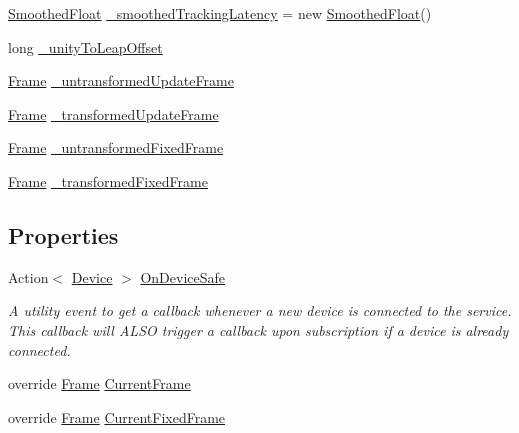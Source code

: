 \begin{DoxyCompactItemize}
\mbox{\hyperlink{class_leap_1_1_unity_1_1_smoothed_float}{Smoothed\+Float}} \mbox{\hyperlink{class_leap_1_1_unity_1_1_leap_service_provider_a03a08f2d279d9884cb6d754ce4412ac2}{\+\_\+smoothed\+Tracking\+Latency}} = new \mbox{\hyperlink{class_leap_1_1_unity_1_1_smoothed_float}{Smoothed\+Float}}()
\item 
long \mbox{\hyperlink{class_leap_1_1_unity_1_1_leap_service_provider_a7900d6d7021d9283515d8d42bd5984ad}{\+\_\+unity\+To\+Leap\+Offset}}
\item 
\mbox{\hyperlink{class_leap_1_1_frame}{Frame}} \mbox{\hyperlink{class_leap_1_1_unity_1_1_leap_service_provider_a755ed665a53e5ea05559aad7704179d4}{\+\_\+untransformed\+Update\+Frame}}
\item 
\mbox{\hyperlink{class_leap_1_1_frame}{Frame}} \mbox{\hyperlink{class_leap_1_1_unity_1_1_leap_service_provider_ac15ba4ed3804cbef57d8415dcae4fe42}{\+\_\+transformed\+Update\+Frame}}
\item 
\mbox{\hyperlink{class_leap_1_1_frame}{Frame}} \mbox{\hyperlink{class_leap_1_1_unity_1_1_leap_service_provider_a98ea79a3b9e6c2d51ff87ae797ea96c1}{\+\_\+untransformed\+Fixed\+Frame}}
\item 
\mbox{\hyperlink{class_leap_1_1_frame}{Frame}} \mbox{\hyperlink{class_leap_1_1_unity_1_1_leap_service_provider_a59d1141c5d960ef97315934118fb4afd}{\+\_\+transformed\+Fixed\+Frame}}
\end{DoxyCompactItemize}
\subsection*{Properties}
\begin{DoxyCompactItemize}
\item 
Action$<$ \mbox{\hyperlink{class_leap_1_1_device}{Device}} $>$ \mbox{\hyperlink{class_leap_1_1_unity_1_1_leap_service_provider_a3d7b925adafada59a54fd28c53a7f86d}{On\+Device\+Safe}}
\begin{DoxyCompactList}\small\item\em A utility event to get a callback whenever a new device is connected to the service. This callback will A\+L\+SO trigger a callback upon subscription if a device is already connected. \end{DoxyCompactList}\item 
override \mbox{\hyperlink{class_leap_1_1_frame}{Frame}} \mbox{\hyperlink{class_leap_1_1_unity_1_1_leap_service_provider_ad651609e570c614c6d99de319ad990cd}{Current\+Frame}}
\item 
override \mbox{\hyperlink{class_leap_1_1_frame}{Frame}} \mbox{\hyperlink{class_leap_1_1_unity_1_1_leap_service_provider_a702f0ea7c9a82cdc65738b8545235d60}{Current\+Fixed\+Frame}}
\end{DoxyCompactItemize}
